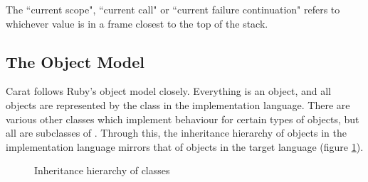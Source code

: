 The ``current scope", ``current call" or ``current failure continuation" refers to whichever value is in a frame closest to the top of the stack.

\subsection{The Object Model}
\label{sec:object_model}

Carat follows Ruby's object model closely. Everything is an object, and all objects are represented by the class  in the implementation language. There are various other classes which implement behaviour for certain types of objects, but all are subclasses of . Through this, the inheritance hierarchy of  objects in the implementation language mirrors that of objects in the target language (figure \ref{fig:data_object_hierarchy}).

\begin{figure}
\begin{center}
\caption{Inheritance hierarchy of  classes}
\label{fig:data_object_hierarchy}
\end{center}
\end{figure}

\subsubsection{}

